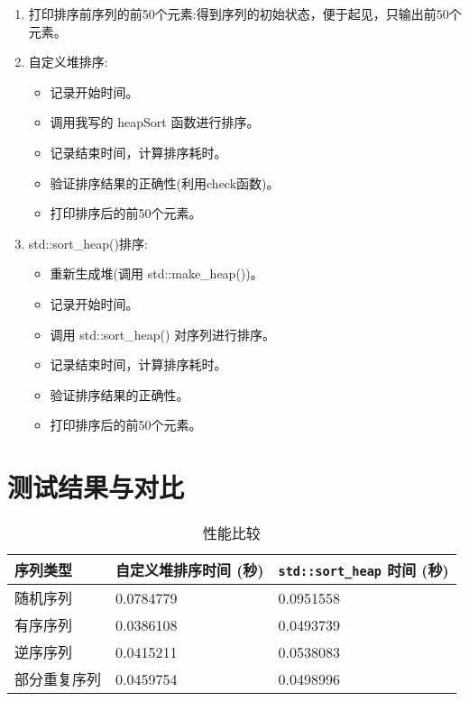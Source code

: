 \documentclass{article}
\begin{document}
    \begin{enumerate}
        \item 打印排序前序列的前50个元素:得到序列的初始状态，便于起见，只输出前50个元素。

        \item 自定义堆排序:
        \begin{itemize}
            \item 记录开始时间。
            \item 调用我写的 heapSort 函数进行排序。
            \item 记录结束时间，计算排序耗时。
            \item 验证排序结果的正确性(利用check函数)。
            \item 打印排序后的前50个元素。
        \end{itemize}

        \item std::sort\_heap()排序:
        \begin{itemize}
            \item 重新生成堆(调用 std::make\_heap())。
            \item 记录开始时间。
            \item 调用 std::sort\_heap() 对序列进行排序。
            \item 记录结束时间，计算排序耗时。
            \item 验证排序结果的正确性。
            \item 打印排序后的前50个元素。
        \end{itemize}

    \end{enumerate}

    \section{测试结果与对比}

\begin{table}[h!]
\centering
\begin{tabular}{@{}lll@{}}
\toprule
序列类型 & 自定义堆排序时间 (秒) & \lstinline|std::sort_heap| 时间 (秒) \\ \midrule
随机序列 & 0.0784779 & 0.0951558 \\
有序序列 & 0.0386108 & 0.0493739 \\
逆序序列 & 0.0415211 & 0.0538083 \\
部分重复序列 & 0.0459754 & 0.0498996 \\ \bottomrule
\end{tabular}
\caption{性能比较}
\label{tab:performance_comparison}
\end{table}
\end{document}
